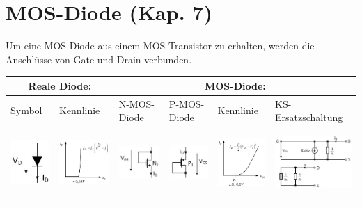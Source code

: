
\section{MOS-Diode (Kap. 7)}
Um eine MOS-Diode aus einem MOS-Transistor zu erhalten, werden die Anschlüsse von Gate und Drain verbunden.\\ 
\begin{tabular}{|p{}|p{}|p{}|p{}|p{}|p{}|}
	\hline
	\multicolumn{2}{|c|}{\textbf{Reale Diode:}}&\multicolumn{4}{c|}{\textbf{MOS-Diode:}}\\ \hline
	Symbol&Kennlinie&N-MOS-Diode&P-MOS-Diode&Kennlinie&KS-Ersatzschaltung\\
	\includegraphics[height=2.6cm]{chapters/Diode/images/realeDiode}&
	\includegraphics[height=2.6cm]{chapters/Diode/images/KennlinieRealeDiode}&
	\includegraphics[height=2.6cm]{chapters/Diode/images/NMOS-Diode}&
	\includegraphics[height=2.6cm]{chapters/Diode/images/PMOS-Diode}&
	\includegraphics[height=2.6cm]{chapters/Diode/images/KennlinieDiode}&
	\includegraphics[height=2.6cm]{chapters/Diode/images/KS_Diode}\\ \hline
\end{tabular}\\[1ex]
